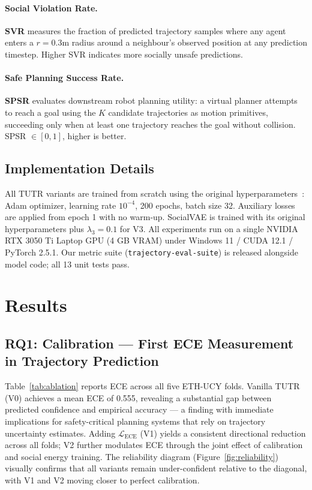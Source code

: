 \paragraph{Social Violation Rate.}
\textbf{SVR} measures the fraction of predicted trajectory samples where any
agent enters a $r = 0.3$m radius around a neighbour's observed position at any
prediction timestep. Higher SVR indicates more socially unsafe predictions.

\paragraph{Safe Planning Success Rate.}
\textbf{SPSR} evaluates downstream robot planning utility: a virtual planner
attempts to reach a goal using the $K$ candidate trajectories as motion
primitives, succeeding only when at least one trajectory reaches the goal
without collision. SPSR $\in [0,1]$, higher is better.

\subsection{Implementation Details}
\label{sec:exp:impl}

All TUTR variants are trained from scratch using the original
hyperparameters~\cite{shi2023tutr}: Adam optimizer, learning rate $10^{-4}$,
200 epochs, batch size 32. Auxiliary losses are applied from epoch 1 with no
warm-up. SocialVAE is trained with its original hyperparameters plus
$\lambda_3 = 0.1$ for V3. All experiments run on a single NVIDIA RTX 3050 Ti
Laptop GPU (4 GB VRAM) under Windows 11 / CUDA 12.1 / PyTorch 2.5.1.
Our metric suite (\texttt{trajectory-eval-suite}) is released alongside
model code; all 13 unit tests pass.



\section{Results}
\label{sec:results}

\subsection{RQ1: Calibration — First ECE Measurement in Trajectory Prediction}
\label{sec:results:rq1}

Table~\ref{tab:ablation} reports ECE across all five ETH-UCY folds.
Vanilla TUTR (V0) achieves a mean ECE of 0.555, revealing a substantial
gap between predicted confidence and empirical accuracy — a finding with
immediate implications for safety-critical planning systems that rely on
trajectory uncertainty estimates. Adding $\mathcal{L}_{\text{ECE}}$ (V1)
yields a consistent directional reduction across all folds; V2 further
modulates ECE through the joint effect of calibration and social energy
training. The reliability diagram (Figure~\ref{fig:reliability}) visually
confirms that all variants remain under-confident relative to the diagonal,
with V1 and V2 moving closer to perfect calibration.

